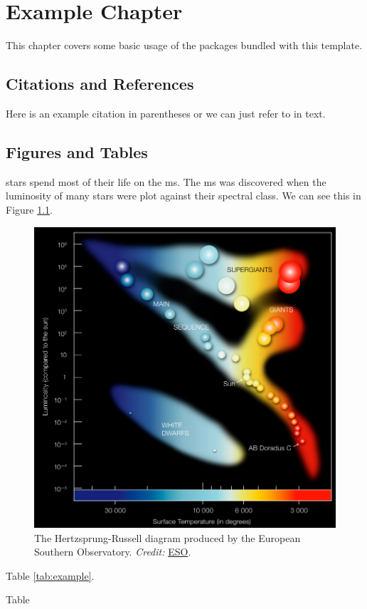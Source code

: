 \chapter{Example Chapter}

This chapter covers some basic usage of the packages bundled with this template.

\section{Citations and References}

Here is an example citation in parentheses \citep{einstein} or we can just refer to \citet{dirac} in text.

\section{Figures and Tables}

\Glspl{star} spend most of their life on the \acrfull{ms}. The \acrshort{ms} was discovered when the \gls{luminosity} of many stars were plot against their spectral class. We can see this in Figure \ref{fig:example}. 

\begin{figure}[t]
  \centering
  \includegraphics{figures/example.pdf}
  \caption[Short version of caption]{The Hertzsprung-Russell diagram produced by the European Southern Observatory. \emph{Credit:} \href{https://www.eso.org/public/images/eso0728c/}{ESO}.}
  \label{fig:example}
\end{figure}

Table \ref{tab:example}.

\begin{table}
  \centering
  \caption[Short version of caption]{Table}
  \label{tab:example}
  
\end{table}

\lipsum[17]
